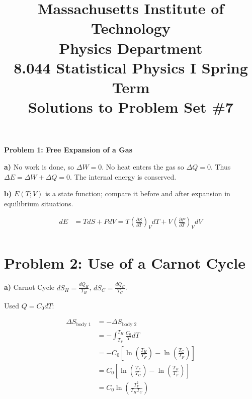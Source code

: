 \documentclass{article}
\begin{document}
\title{Massachusetts Institute of Technology \\
Physics Department \\
8.044 Statistical Physics I Spring Term \\
Solutions to Problem Set \#7}

\maketitle

\noindent \textbf{Problem 1: Free Expansion of a Gas}

\noindent \textbf{a)} No work is done, so $\Delta W = 0$. No heat enters the gas so $\Delta Q= 0$. Thus $\Delta E = \Delta W+ \Delta Q = 0$. The internal energy is conserved.

\noindent \textbf{b)} $E(T;V )$ is a state function; compare it before and after expansion in equilibrium situations.

\begin{equation*}
\begin{split}
dE &= TdS + PdV = T \left (\frac{\partial S}{\partial T} \right )_V dT + V  \left (\frac{\partial P}{\partial T} \right )_V dV \\
\end{split}
\end{equation*}

\setcounter{section}{1}
\section*{Problem 2: Use of a Carnot Cycle}

\noindent \textbf{a)} Carnot Cycle $dS_H= \frac{dQ_H}{T_H}$, $dS_C = \frac{dQ_C}{T_C}$. 

\noindent Used $Q=C_0dT$:

\begin{equation*}
\begin{split}
\Delta S_{\text{body 1}} &= -\Delta S_{\text{body 2}} \\
&= -\int_{T_F}^{T_H} \frac{C_0}{T}dT \\
&= -C_0\left[ \ln\left(\frac{T_H}{T_F}\right) - \ln\left(\frac{T_C}{T_F}\right)\right] \\
&= C_0\left [\ln\left(\frac{T_F}{T_C}\right) - \ln\left(\frac{T_H}{T_F}\right) \right ] \\
&= C_0\ln\left( \frac{T_F^2}{T_HT_C}\right) \\
\end{split}
\end{equation*}
\end{document}
